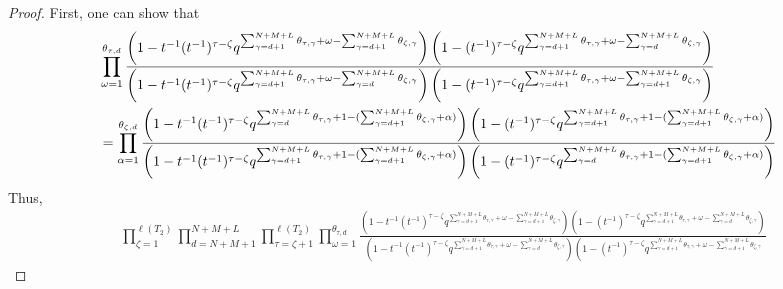 \documentclass[12pt,reqno,a4paper]{amsart}
\numberwithin{equation}{section}
\theoremstyle{definition}
\begin{document}
\begin{proof}
First, one can show that 
\footnotesize
\begin{align}
	&\prod_{\omega = 1}^{\theta_{\tau,d}}
	\frac{
		\left(		1 - t^{-1} (t^{-1})^{\tau - \zeta}	q^{	\sum_{\gamma = d+1}^{N + M + L}\theta_{\tau,\gamma}	+ \omega - 	\sum_{\gamma = d+ 1}^{N + M + L} \theta_{\zeta,\gamma}				}			\right)
		\left(
		1 - (t^{-1})^{\tau - \zeta}	q^{	\sum_{\gamma = d+1}^{N + M + L}\theta_{\tau,\gamma}	+ \omega - 	\sum_{\gamma = d}^{N + M + L} \theta_{\zeta,\gamma}				}		
		\right)
	}{
		\left(		1 - t^{-1} (t^{-1})^{\tau - \zeta}	q^{	\sum_{\gamma = d+1}^{N + M + L}\theta_{\tau,\gamma}	+ \omega - 	\sum_{\gamma = d}^{N + M + L} \theta_{\zeta,\gamma}				}			\right)
		\left(
		1 - (t^{-1})^{\tau - \zeta}	q^{	\sum_{\gamma = d+1}^{N + M + L}\theta_{\tau,\gamma}	+ \omega - 	\sum_{\gamma = d+1}^{N + M + L} \theta_{\zeta,\gamma}				}		
		\right)
	}
	\\
	&= 
	\prod_{\alpha = 1}^{\theta_{\zeta,d}}
	\frac{
		\left(		1 - t^{-1} (t^{-1})^{\tau - \zeta} q^{	\sum_{\gamma = d}^{N+M+L} \theta_{\tau,\gamma}	+ 1	- (\sum_{\gamma = d + 1}^{N+M+L} \theta_{\zeta,\gamma} + \alpha)		}					\right)
		\left(
		1 - (t^{-1})^{\tau - \zeta} q^{	\sum_{\gamma = d + 1}^{N+M+L} \theta_{\tau,\gamma}	+ 1	- (\sum_{\gamma = d + 1}^{N+M+L} \theta_{\zeta,\gamma} + \alpha)		}	
		\right)
	}{
		\left(		1 - t^{-1} (t^{-1})^{\tau - \zeta} q^{	\sum_{\gamma = d + 1}^{N+M+L} \theta_{\tau,\gamma}	+ 1	- (\sum_{\gamma = d + 1}^{N+M+L} \theta_{\zeta,\gamma} + \alpha)		}					\right)
		\left(
		1 - (t^{-1})^{\tau - \zeta} q^{	\sum_{\gamma = d}^{N+M+L} \theta_{\tau,\gamma}	+ 1	- (\sum_{\gamma = d + 1}^{N+M+L} \theta_{\zeta,\gamma} + \alpha)		}	
		\right)
	}
	\notag 
\end{align}
\normalsize
Thus,
\footnotesize
\begin{align}
	&\prod_{\zeta = 1}^{\ell(T_2)}
	\prod_{d = N+M+1}^{N+M+L} 
	\prod_{\tau = \zeta + 1}^{\ell(T_2)} 
	\prod_{\omega = 1}^{\theta_{\tau,d}}
	\frac{
		\left(		1 - t^{-1} (t^{-1})^{\tau - \zeta}	q^{	\sum_{\gamma = d+1}^{N + M + L}\theta_{\tau,\gamma}	+ \omega - 	\sum_{\gamma = d+ 1}^{N + M + L} \theta_{\zeta,\gamma}				}			\right)
		\left(
		1 - (t^{-1})^{\tau - \zeta}	q^{	\sum_{\gamma = d+1}^{N + M + L}\theta_{\tau,\gamma}	+ \omega - 	\sum_{\gamma = d}^{N + M + L} \theta_{\zeta,\gamma}				}		
		\right)
	}{
		\left(		1 - t^{-1} (t^{-1})^{\tau - \zeta}	q^{	\sum_{\gamma = d+1}^{N + M + L}\theta_{\tau,\gamma}	+ \omega - 	\sum_{\gamma = d}^{N + M + L} \theta_{\zeta,\gamma}				}			\right)
		\left(
		1 - (t^{-1})^{\tau - \zeta}	q^{	\sum_{\gamma = d+1}^{N + M + L}\theta_{\tau,\gamma}	+ \omega - 	\sum_{\gamma = d+1}^{N + M + L} \theta_{\zeta,\gamma}				}		
}
\end{align}
\end{proof}
\end{document}

